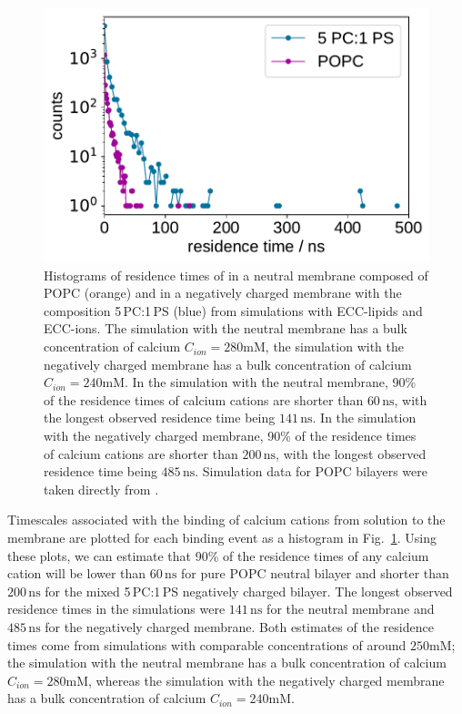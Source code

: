 \documentclass[journal=jpcbfk,manuscript=article]{achemso}
\newlength{\figwidth}
\begin{document}
\begin{figure}[tb!]
  \centering
  \includegraphics[width=\figwidth]{../img/histogram_bound_times_26CaCl2_comparison_PC-PCPS.pdf}
  \caption{\label{fig:hist_residence_times}
   Histograms of residence times of  
   in a neutral membrane composed of POPC (orange)
   and in a negatively charged membrane with the composition 5\,PC:1\,PS (blue)
   from simulations with ECC-lipids and ECC-ions.
   The simulation with the neutral membrane has a bulk concentration of calcium $C_{ion} = 280\mathrm{mM}$, 
   the simulation with the negatively charged membrane has a bulk concentration of calcium $C_{ion} = 240\mathrm{mM}$. 
   In the simulation with the neutral membrane, 
   90\% of the residence times of calcium cations are
   shorter than $60\,\mathrm{ns}$, %
   with the longest observed residence time being $141\,\mathrm{ns}$. 
   In the simulation with the negatively charged membrane, 
   90\% of the residence times of calcium cations are
   shorter than $200\,\mathrm{ns}$, %
   with the longest observed residence time being $485\,\mathrm{ns}$. 
   Simulation data for POPC bilayers were taken directly from \cite{melcr18}. 
   }
\end{figure}


Timescales associated with the binding of calcium cations from solution to the membrane
are plotted for each binding event as a histogram in Fig.~\ref{fig:hist_residence_times}. 
Using these plots, we can estimate that 90\% of the residence times of any calcium cation 
will be lower than $60\,\mathrm{ns}$ for pure POPC neutral bilayer 
and shorter than $200\,\mathrm{ns}$ for the mixed 5\,PC:1\,PS negatively charged bilayer. 
The longest observed residence times in the simulations were $141\,\mathrm{ns}$ for the neutral membrane 
and $485\,\mathrm{ns}$ for the negatively charged membrane. 
Both estimates of the residence times come from simulations with comparable concentrations of around $250\mathrm{mM}$;
the simulation with the neutral membrane has a bulk concentration of calcium $C_{ion} = 280\mathrm{mM}$, 
whereas the simulation with the negatively charged membrane has a bulk concentration of calcium $C_{ion} = 240\mathrm{mM}$. 
\end{document}
